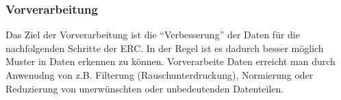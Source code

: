 \subsubsection{Vorverarbeitung} \label{vorverarbeitung-0}

Das Ziel der Vorverarbeitung ist die ``Verbesserung'' der Daten f{\"u}r die nachfolgenden Schritte der ERC. In der Regel ist es dadurch besser m{\"o}glich Muster in Daten erkennen zu k{\"o}nnen. 
Vorverarbeite Daten erreicht man durch Anwenudng von z.B. Filterung (Rauschunterdruckung), Normierung oder Reduzierung von unerw{\"u}nschten oder unbedeutenden Datenteilen. \\